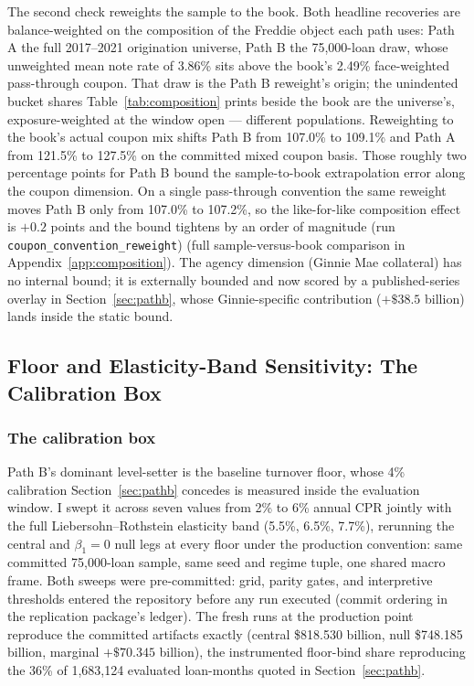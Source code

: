 \documentclass[12pt]{article}
\begin{document}
The second check reweights the sample to the book. Both headline recoveries are balance-weighted on the composition of the Freddie object each path uses: Path A the full 2017--2021 origination universe, Path B the 75,000-loan draw, whose unweighted mean note rate of 3.86\% sits above the book's 2.49\% face-weighted pass-through coupon. That draw is the Path B reweight's origin; the unindented bucket shares Table~\ref{tab:composition} prints beside the book are the universe's, exposure-weighted at the window open --- different populations. Reweighting to the book's actual coupon mix shifts Path B from 107.0\% to 109.1\% and Path A from 121.5\% to 127.5\% on the committed mixed coupon basis. Those roughly two percentage points for Path B bound the sample-to-book extrapolation error along the coupon dimension. On a single pass-through convention the same reweight moves Path B only from 107.0\% to 107.2\%, so the like-for-like composition effect is $+0.2$ points and the bound tightens by an order of magnitude (run \texttt{coupon\_convention\_reweight}) (full sample-versus-book comparison in Appendix~\ref{app:composition}). The agency dimension (Ginnie Mae collateral) has no internal bound; it is externally bounded and now scored by a published-series overlay in Section~\ref{sec:pathb}, whose Ginnie-specific contribution ($+\$38.5$ billion) lands inside the static bound.

\subsection{Floor and Elasticity-Band Sensitivity: The Calibration Box}\label{sec:robustness-floor}

\subsubsection{The calibration box}

Path B's dominant level-setter is the baseline turnover floor, whose 4\% calibration Section~\ref{sec:pathb} concedes is measured inside the evaluation window. I swept it across seven values from 2\% to 6\% annual CPR jointly with the full Liebersohn--Rothstein elasticity band (5.5\%, 6.5\%, 7.7\%), rerunning the central and $\beta_1 = 0$ null legs at every floor under the production convention: same committed 75,000-loan sample, same seed and regime tuple, one shared macro frame. Both sweeps were pre-committed: grid, parity gates, and interpretive thresholds entered the repository before any run executed (commit ordering in the replication package's ledger). The fresh runs at the production point reproduce the committed artifacts exactly (central \$818.530 billion, null \$748.185 billion, marginal $+\$70.345$ billion), the instrumented floor-bind share reproducing the 36\% of 1,683,124 evaluated loan-months quoted in Section~\ref{sec:pathb}.
\end{document}
